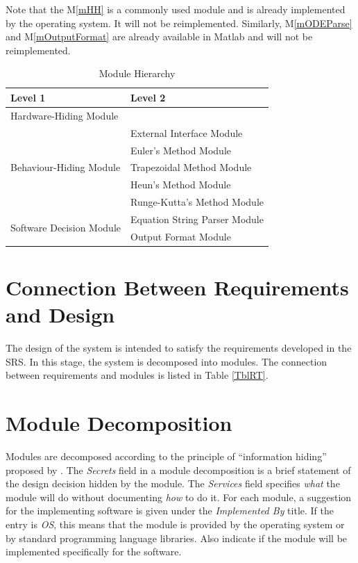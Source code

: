 \documentclass[12pt, titlepage]{article}
\begin{document}
Note that the M\ref{mHH} is a commonly used module and is already implemented by the operating system. It will not be reimplemented.
Similarly, M\ref{mODEParse} and M\ref{mOutputFormat} are already available in Matlab and will not be reimplemented.

\begin{table}[H]
\centering
\begin{tabular}{p{} p{}}
\toprule
\textbf{Level 1} & \textbf{Level 2}\\
\midrule

{Hardware-Hiding Module} & ~ \\
\midrule

\multirow{5}{0.3\textwidth}{Behaviour-Hiding Module} & External Interface Module\\
& Euler's Method Module\\
& Trapezoidal Method Module\\
& Heun's Method Module\\
& Runge-Kutta's Method Module\\
\midrule

\multirow{2}{0.3\textwidth}{Software Decision Module} & {Equation String Parser Module}\\
& Output Format Module\\
\bottomrule

\end{tabular}
\caption{Module Hierarchy}
\label{TblMH}
\end{table}

\section{Connection Between Requirements and Design} \label{SecConnection}

The design of the system is intended to satisfy the requirements developed in
the SRS. In this stage, the system is decomposed into modules. The connection
between requirements and modules is listed in Table \ref{TblRT}.

\section{Module Decomposition} \label{SecMD}

Modules are decomposed according to the principle of ``information hiding''
proposed by \citet{ParnasEtAl1984}. The \emph{Secrets} field in a module
decomposition is a brief statement of the design decision hidden by the
module. The \emph{Services} field specifies \emph{what} the module will do
without documenting \emph{how} to do it. For each module, a suggestion for the
implementing software is given under the \emph{Implemented By} title. If the
entry is \emph{OS}, this means that the module is provided by the operating
system or by standard programming language libraries.  Also indicate if the
module will be implemented specifically for the software.
\end{document}
